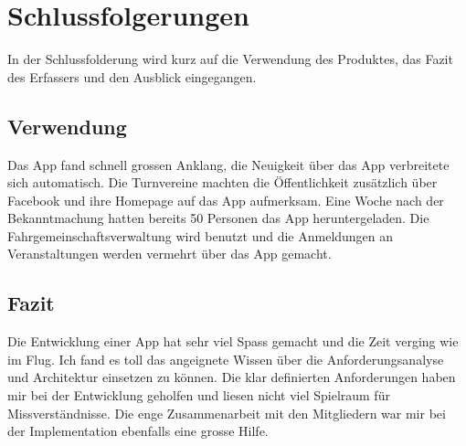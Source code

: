 %
%

\chapter{Schlussfolgerungen}\label{chap.Schlussfolgerungen}
In der Schlussfolderung wird kurz auf die Verwendung des Produktes, das Fazit des Erfassers und den Ausblick eingegangen.

\section{Verwendung}\label{fazit_verwendung}
Das App fand schnell grossen Anklang, die Neuigkeit über das App verbreitete sich automatisch. Die Turnvereine machten die Öffentlichkeit zusätzlich über Facebook und ihre Homepage auf das App aufmerksam. Eine Woche nach der Bekanntmachung hatten bereits 50 Personen das App heruntergeladen. Die Fahrgemeinschaftsverwaltung wird benutzt und die Anmeldungen an Veranstaltungen werden vermehrt über das App gemacht.

\section{Fazit}\label{fazit}

Die Entwicklung einer App hat sehr viel Spass gemacht und die Zeit verging wie im Flug. Ich fand es toll das angeignete Wissen über die Anforderungsanalyse und Architektur einsetzen zu können. Die klar definierten Anforderungen haben mir bei der Entwicklung geholfen und liesen nicht viel Spielraum für Missverständnisse. Die enge Zusammenarbeit mit den Mitgliedern war mir bei der Implementation ebenfalls eine grosse Hilfe.\\

